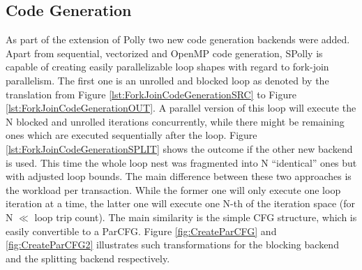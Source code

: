 


\subsection{Code Generation}
\label{CodeGeneration}
As part of the extension of Polly two new code generation backends were added. 
Apart from sequential, vectorized and OpenMP code generation, SPolly is 
capable of creating easily parallelizable loop shapes with regard to fork-join
parallelism. The first one is an unrolled and blocked loop as denoted by the 
translation from Figure \ref{lst:ForkJoinCodeGenerationSRC} to
Figure \ref{lst:ForkJoinCodeGenerationOUT}. A parallel version of this loop will
execute the N blocked and unrolled iterations concurrently, while there might 
be remaining ones which are executed sequentially after the loop. 
Figure \ref{lst:ForkJoinCodeGenerationSPLIT} shows the outcome if the other new
backend is used. This time the whole loop nest was fragmented into N ``identical''
ones but with adjusted loop bounds. The main difference between these two approaches 
is the workload per transaction. While the former one will only execute one
loop iteration at a time, the latter one will execute one N-th of the 
iteration space (for N $\ll$ loop trip count). The main similarity is the
simple CFG structure, which is easily convertible to a ParCFG.
Figure \ref{fig:CreateParCFG} and \ref{fig:CreateParCFG2} illustrates such
transformations for the blocking backend and the splitting backend respectively.  

